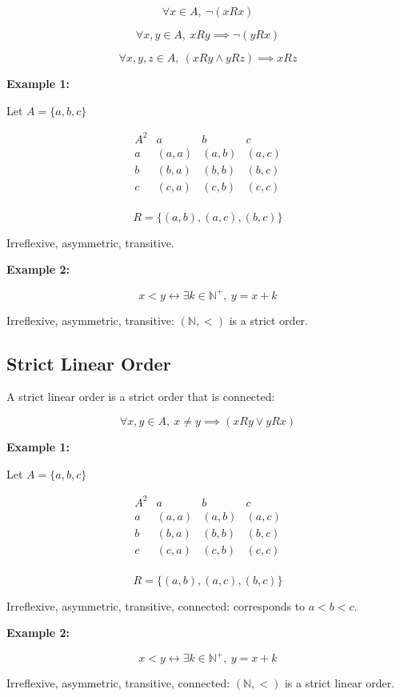 \documentclass[12pt,a4paper,openany]{article}
\begin{document}
$$ \forall x \in A, \ \neg(xRx)$$

$$\forall x,y \in A, \ xRy \implies \neg(yRx)$$

$$\forall x,y,z \in A, \ (xRy \land yRz) \implies xRz$$

\textbf{Example 1:}

Let $A = \{a,b,c\}$

$$
\begin{array}{c|ccc}
A^2 & a & b & c \\
\hline
a & (a,a) & (a,b) & (a,c) \\
b & (b,a) & (b,b) & (b,c) \\
c & (c,a) & (c,b) & (c,c) \\
\end{array}
$$

$$
R = \{(a,b),(a,c),(b,c)\}
$$

Irreflexive, asymmetric, transitive.

\textbf{Example 2:}

$$
x < y \leftrightarrow \exists k \in \mathbb{N}^+, \ y = x+k
$$

Irreflexive, asymmetric, transitive: $(\mathbb{N},<)$ is a strict order.

\subsection{Strict Linear Order}

A strict linear order is a strict order that is connected:

$$
\forall x,y \in A, \ x \neq y \implies (xRy \lor yRx)
$$

\textbf{Example 1:}

Let $A = \{a,b,c\}$

$$
\begin{array}{c|ccc}
A^2 & a & b & c \\
\hline
a & (a,a) & (a,b) & (a,c) \\
b & (b,a) & (b,b) & (b,c) \\
c & (c,a) & (c,b) & (c,c) \\
\end{array}
$$

$$
R = \{(a,b),(a,c),(b,c)\}
$$

Irreflexive, asymmetric, transitive, connected: corresponds to $a < b < c$.

\textbf{Example 2:}

$$
x < y \leftrightarrow \exists k \in \mathbb{N}^+, \ y = x+k
$$

Irreflexive, asymmetric, transitive, connected: $(\mathbb{N},<)$ is a strict linear order.
\end{document}
